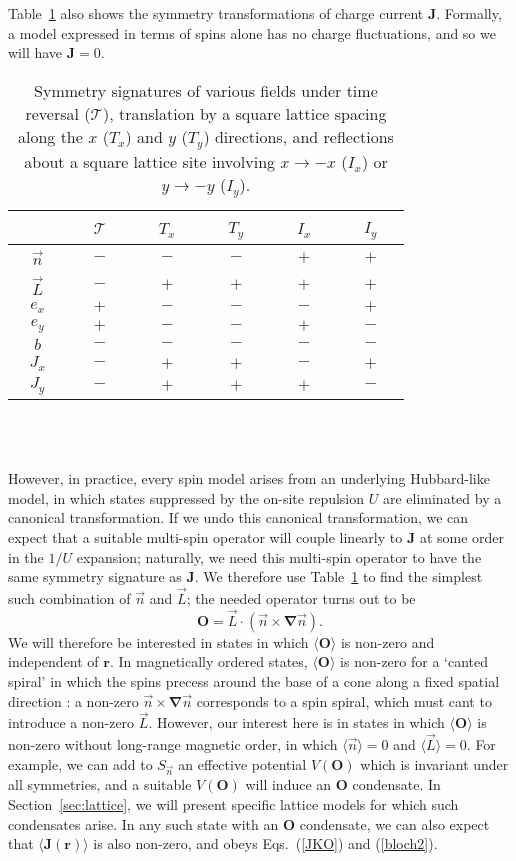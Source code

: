 \documentclass[aps,prb,preprint,onecolumn,citeautoscript,superscriptaddress,footinbib,
eqsecnum]{revtex4-1}
\newcommand{\beq}{\begin{equation}}
\newcommand{\eeq}{\end{equation}}
\begin{document}
Table~\ref{table:o3} also shows the symmetry transformations of charge current ${\bm J}$. 
Formally, a model expressed in terms of spins alone has no charge fluctuations, and so we will have ${\bm J}=0$. 
\begin{table}
\begin{tabular}{|c|c|c|c|c|c|}
\hline
~~ & ~~$\mathcal{T}$~~ & ~~$T_x$~~ & ~~$T_y$~~ & ~~$I_x$~~ & ~~$I_y$~~ \\
\hline
~~$\vec{n}$~~ & $-$ & $-$ & $-$ & $+$ & $+$ \\
$\vec{L}$ & $-$ & $+$ & $+$ & $+$ & $+$\\
$ e_x $ & $+$ & $-$ & $-$ & $-$ & $+$ \\ 
$ e_y $ & $+$ & $-$ & $-$ & $+$ & $-$ \\ 
$b$ & $-$ & $-$ & $-$ & $-$ & $-$ \\
$J_x$ & $-$ & $+$ & $+$ & $-$ & $+$ \\
$J_y$ & $-$ & $+$ & $+$ & $+$ & $-$ \\
\hline
\end{tabular}~\\~\\
\caption{Symmetry signatures of various fields under time reversal ($\mathcal{T}$), translation by a square lattice spacing along the $x$
($T_x$) and $y$ ($T_y$) directions, and reflections about a square lattice site involving $x \rightarrow -x$ ($I_x$) or $y \rightarrow -y$ ($I_y$).}
\label{table:o3}
\end{table}
However, in practice, every spin model arises from an underlying Hubbard-like model, in which
states suppressed by the on-site repulsion $U$ are eliminated by a canonical transformation. If we undo this canonical transformation, we can
expect that a suitable multi-spin operator will couple linearly to ${\bm J}$ at some order in the $1/U$ expansion; naturally, we need this
multi-spin operator to have the same symmetry signature as ${\bm J}$.
We therefore use Table~\ref{table:o3} to find the simplest such combination of $\vec{n}$ and $\vec{L}$;
the needed operator turns out to be
\beq
{\bm O} = \vec{L} \cdot ( \vec{n} \times {\bm \nabla} \vec{n} ). \label{Oo3}
\eeq
We will therefore be interested in states in which $\langle {\bm O} \rangle$ is non-zero and independent of ${\bm r}$. 
In magnetically ordered states, $\langle {\bm O} \rangle$ is non-zero for a `canted spiral' in which the spins precess around the base of a cone along a fixed spatial direction \cite{PhysRevLett.108.087205}: a non-zero 
$\vec{n} \times {\bm \nabla} \vec{n}$ corresponds to a spin spiral, which must cant to introduce a non-zero $\vec{L}$.
However, our interest here is in states in which $\langle {\bm O} \rangle$ is non-zero without long-range magnetic order,
in which 
$\langle \vec{n} \rangle =0$ and $\langle \vec{L} \rangle = 0$. For example, we can add to $S_{\vec{n}}$ an
effective potential $V ({\bm O})$ which is invariant under all symmetries, and a suitable $V ({\bm O})$ will induce an ${\bm O}$ condensate.
In Section~\ref{sec:lattice}, we will present specific lattice models for which such condensates arise.
In any such state with an ${\bm O}$ condensate, we can also expect that $\langle {\bm J} ({\bm r}) \rangle$ is also non-zero, and obeys Eqs.~(\ref{JKO}) and (\ref{bloch2}).
\end{document}
